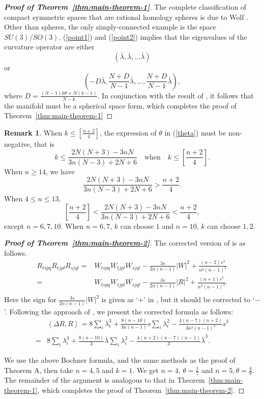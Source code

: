 \documentclass[11pt, reqno]{amsart}
\numberwithin{equation}{section}
\theoremstyle{definition}
\newtheorem{remark}[thm]{Remark}
\begin{document}
\begin{proof}[\textbf{Proof of Theorem~\ref{thm:main-theorem-1}}]
		The complete classification of compact symmetric spaces that are rational homology spheres is due to Wolf \cite[Theorem 1]{Wo}. Other than spheres, the only simply-connected example is the space ${SU(3)}/{SO(3)}.$ (\ref{point1}) and (\ref{point2}) implies that the eigenvalues of the curvature operator are either 
		$$(\bar{\lambda },\bar{\lambda },\ldots \bar{\lambda })$$
		or 
		$$(-D\bar{\lambda },\frac{N+D}{N-1}\bar{\lambda },\ldots ,\frac{N+D}{N-1}\bar{\lambda }),$$
		where $D=\frac{(N-1)k\theta +N(k-1)}{N-k}$.  In conjunction with the result of \cite[Example 4.5]{NP}, it follows that the manifold must be a spherical space form,
		which completes the proof of Theorem~\ref{thm:main-theorem-1}
	\end{proof}
	
	\begin{remark}
		When $k\le [\frac{n+2}{4}]$, the expression of $\theta$ in (\ref{theta}) must be non-negative, that is 
		$$k\le \frac{2N(N+3)-3nN}{3n(N-3)+2N+6}\quad \text{when}\quad k\le [\frac{n+2}{4}].$$ 
		When $n\ge 14$, we have 
		$$\frac{2N(N+3)-3nN}{3n(N-3)+2N+6}>\frac{n+2}{4}.$$ 
		When $4 \le n \le 13$, 
		$$[\frac{n+2}{4}]<\frac{2N(N+3)-3nN}{3n(N-3)+2N+6}<\frac{n+2}{4},$$
		except $n=6,7,10$. When $n=6,7$, $k$ can choose $1$ and $n=10$, $k$ can choose $1,2.$		
	\end{remark}
	\begin{proof}[\textbf{Proof of Theorem~\ref{thm:main-theorem-2}}] The corrected version of \cite[(4.9)]{DF} is as follows.
\begin{equation*}
		\begin{aligned}
			{R_{tspq}}{R_{tjpl}}{R_{sjql}}
						=& {W_{tspq}}{W_{tjpl}}{W_{sjql}} - \frac{3s}{2n(n - 1)}\left| W \right|^2 + \frac{(n-2)s^3}{n^2(n - 1)^2}\\
			=& {W_{tspq}}{W_{tjpl}}{W_{sjql}} - \frac{3s}{2n(n - 1)}\left| R \right|^2 + \frac{(n+1)s^3}{n^2(n-1)^2}.\\
		\end{aligned}
	\end{equation*}
Here the sign for $\frac{{3s}}{{2n(n - 1)}}{\left| W \right|^2}$ is given as `$+$' in \cite[(4.9)]{DF}, but it should be corrected to `$-$'.
Following the approach of \cite{DF},  we present the corrected formula as follows:
\begin{align}\label{Bochner}
		& \left\langle \Delta R,R \right\rangle =8\sum\limits_{i }{\lambda _{i}^{3}}+\frac{8(n-10)}{3n(n-1)}s\sum\limits_{i}{\lambda _{i}^2}-\frac{4(n-7)(n+2)}{3n^3(n-1)^2}s^3 \nonumber\\ 
		=&8\sum\limits_{i}{\lambda _{i}^3}+\frac{8(n-10)}{3}\bar{\lambda }\sum\limits_{i}{\lambda _{i}^{2}}-\frac{4(n+2)(n-7)(n-1)}{3}\bar{\lambda }^3.
	\end{align}


	
	We use the above Bochner formula, and the same methods as the proof of Theorem A, then take $n=4,5$ and $k=1$. We get $n=4$, $\theta=\frac{1}{7}$ and $n=5,\theta=\frac{4}{9}$. The remainder of the argument is analogous to that in Theorem~\ref{thm:main-theorem-1}, which completes the proof of Theorem~\ref{thm:main-theorem-2}.
\end{proof}
\end{document}
